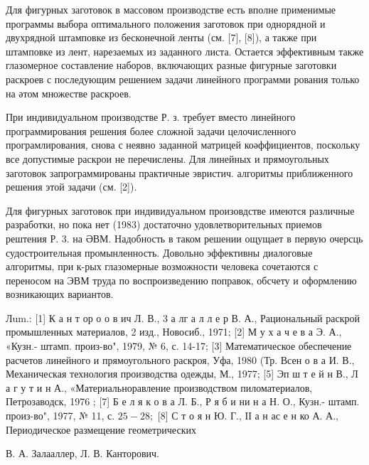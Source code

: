 \documentclass[10pt]{article}
\begin{document}
Для фигурных заготовок в массовом производстве есть вполне применимые программы выбора оптимального положения заготовок при однорядной и двухрядной штамповке из бесконечной ленты (см. [7], [8]), а также при штамповке из лент, нарезаемых из заданного листа. Остается эффективным также глазомерное составление наборов, включающих разные фигурные заготовки раскроев с последующим решением задачи линейного программи рования только на әтом множестве раскроев.



При индивидуальном производстве Р. з. требует вместо линейного программирования решения более сложной задачи целочисленного програмлирования, снова с неявно заданной матрицей коәффициентов, поскольку все допустимые раскрои не перечислены. Для линейных и прямоугольных заготовок запрограммированы практичные эвристич. алгоритмы приближенного решения этой задачи (см. [2]).



Для фигурных заготовок при индивидуальном произовдстве имеются различные разработки, но пока нет (1983) достаточно удовлетворительных приемов рештения Р. 3. на ӘВМ. Надобность в таком решении ощущает в первую очерсць судостроительная промынленность. Довольно эффективны диалоговые алгоритмы, при к-рых глазомерные возможности человека сочетаются с переносом на ЭВМ труда по воспроизведению поправок, обсчету и оформлению возникающих вариантов.



Лum.: [1] К а н т ор о о в ич Л. В., 3 а лг а л л е р В. А., Рациональный раскрой промышленных материалов, 2 изд., Новосиб., 1971; [2] М у х а ч е в а Э. А., «Кузн.- штамп. произ-во", 1979, № 6, с. 14-17; [3] Математическое обеспечение расчетов линейного и прямоугольного раскроя, Уфа, 1980 (Тр. Всен о в а И. В., Механическая технология производства одежды, М., 1977; [5] Эп ш т е й н В., Л а г у т и н А., «Материальноравление производством пиломатериалов, Петрозаводск, 1976 ; [7] Б е л я к о в а Л. Б., Р я б и ни н а Н. О., Кузн.- штамп. произ-во", 1977, № 11, с. $25-28 ;$ [8] С т о я н Ю. Г., ІІ а н ас е н ко А. А., Периодическое размещение геометрических

В. А. Залааллер, Л. В. Канторович.
\end{document}
